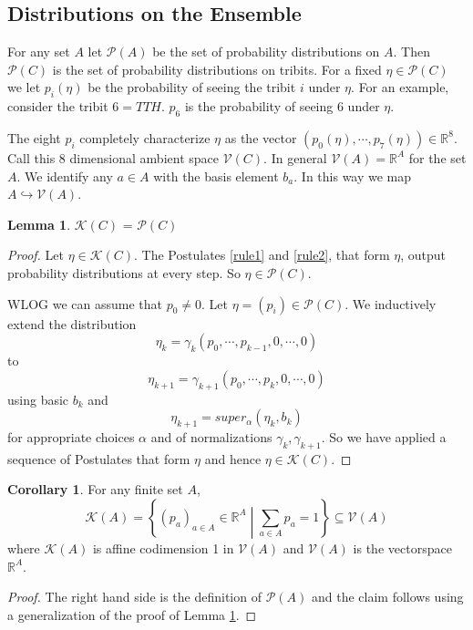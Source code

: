 \documentclass[12pt,a4paper]{article}
\theoremstyle{myrule}
\theoremstyle{postulate}
\theoremstyle{definition}
\newtheorem{corollary}{Corollary}[theorem]
\newtheorem{lemma}[theorem]{Lemma}
\begin{document}
\subsection{Distributions on the Ensemble}

For any set $A$ let $\mathcal{P}(A)$ be the set of probability distributions on $A$.  Then $\mathcal{P}(C)$ is the set of probability distributions on tribits. For a fixed $\eta \in \mathcal{P}(C)$ we let $p_i(\eta)$ be the probability of seeing the tribit $i$ under $\eta$.  For an example, consider the tribit $\mathit{6} = TTH$.  $p_\mathit{6}$ is the probability of seeing $\mathit{6}$ under $\eta$.

The eight $p_i$ completely characterize $\eta$ as the vector $(p_\mathit{0}(\eta),\cdots,p_\mathit{7}(\eta)) \in \mathbb{R}^8$.  Call this 8 dimensional ambient space $\mathcal{V}(C)$. In general $\mathcal{V}(A) = \mathbb{R}^A$ for the set $A$.  We identify any $a \in A$ with the basis element $b_a$.  In this way we map $A \hookrightarrow \mathcal{V}(A)$.
\begin{lemma}
\label{prob}
  $\mathcal{K}(C)$ = $\mathcal{P}(C)$
\end{lemma}
\begin{proof}
  Let $\eta \in \mathcal{K}(C)$.  The Postulates \ref{rule1} and \ref{rule2}, that form $\eta$, output probability distributions at every step.  So $\eta \in \mathcal{P}(C)$.
  
  WLOG we can assume that $p_0 \not = 0$.  Let $\eta = (p_i) \in \mathcal{P}(C)$.  We inductively extend the distribution
  \[
  \eta_k = \gamma_k (p_0, \cdots, p_{k-1}, 0, \cdots, 0)
  \]
  to
  \[
  \eta_{k+1} = \gamma_{k+1} (p_0, \cdots, p_{k}, 0, \cdots, 0)
  \]
  using basic $b_k$ and 
  \[
  \eta_{k+1} = super_\alpha(\eta_k,b_k)
  \]
  for appropriate choices $\alpha$ and of normalizations $\gamma_k, \gamma_{k+1}$. So we have applied a sequence of Postulates that form $\eta$ and hence $\eta \in \mathcal{K}(C)$.
\end{proof}

\begin{corollary}
  For any finite set $A$,
  \[
  \mathcal{K}(A) = \left\{ (p_a)_{a \in A} \in \mathbb{R}^{A} \middle | \sum_{a \in A} p_a = 1 \right\}  \subseteq \mathcal{V}(A)
  \]
where $\mathcal{K}(A)$ is affine codimension 1 in $\mathcal{V}(A)$ and $\mathcal{V}(A)$ is the vectorspace $\mathbb{R}^A$.
\end{corollary}
\begin{proof}
  The right hand side is the definition of $\mathcal{P}(A)$ and the claim follows using a generalization of the proof of Lemma \ref{prob}.
\end{proof}
\end{document}
